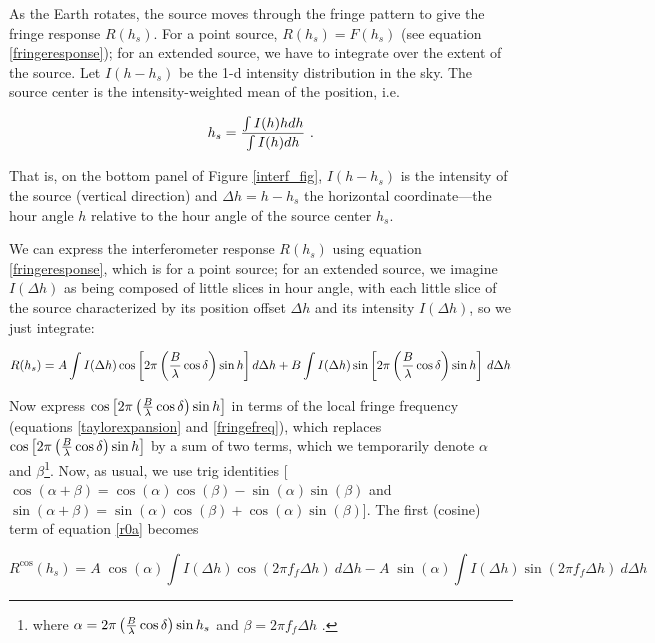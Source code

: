 \documentclass[11pt,preprint]{aastex}
\begin{document}
As the Earth rotates, the source moves through the fringe pattern to
give the fringe response $R(h_s)$. For a point source, $R(h_s)= F(h_s)$
(see equation \ref{fringeresponse}); for an extended source, we have to
integrate over the extent of the source.  Let $I(h - h_s)$ be the 1-d
intensity distribution in the sky. 
The source center is the intensity-weighted mean of the
position, i.e.

\begin{equation}
h_s = { \int I(h)h dh \over \int I(h) dh} \ .
\end{equation}

\noindent That is, on the bottom panel of
Figure \ref{interf_fig}, $I(h - h_s)$ is the intensity of the source (vertical
direction) and $\Delta h= h -h_s$ the horizontal coordinate---the hour
angle $h$ relative to the hour angle of the source center $h_s$. 


We can express the interferometer response $R(h_s)$ using equation
\ref{fringeresponse}, which is for a point source; for an extended source, we
imagine $I(\Delta h)$ as being composed of little slices in hour angle,
with each little slice of the source characterized by its position
offset $\Delta h$ and its intensity $I(\Delta h)$, so we just integrate:

\begin{equation} \label{r0a}
R(h_s) = A \int I(\Delta h) \cos \left[ 2\pi \left( {B \over \lambda}
	\cos\delta \right) \sin h\right] d \Delta h +  
	B \int I(\Delta h) \sin\left[ 2\pi \left( {B \over \lambda}
	\cos\delta \right) \sin h \right] \, d \Delta h
\end{equation} 

Now express $\cos \left[ 2\pi \left( {B \over \lambda} \cos\delta
\right) \sin h\right]$ in terms of the local fringe frequency (equations
\ref{taylorexpansion} and \ref{fringefreq}), which replaces $\cos \left[
2\pi \left( {B \over \lambda} \cos\delta \right) \sin h\right]$ by a sum
of two terms, which we temporarily denote $\alpha$ and
$\beta$\footnote{where $\alpha = 2 \pi \left( {B \over \lambda}
\cos\delta \right) \sin{h_s}$ and $\beta = 2 \pi f_f
\Delta h$ .}.  Now, as usual, we use trig identities [$\cos(\alpha +
\beta) = \cos(\alpha) \cos(\beta) - \sin(\alpha) \sin(\beta)$ and
$\sin(\alpha + \beta) = \sin(\alpha) \cos(\beta) + \cos(\alpha)
\sin(\beta)$]. The first (cosine) term of equation \ref{r0a} becomes

\begin{equation}
R^{\cos}(h_s) = A \; \cos(\alpha) \int I(\Delta h) \cos(2\pi f_f \Delta
h) \ d \Delta h 
-A \; \sin(\alpha) \int I(\Delta h) \sin(2\pi f_f \Delta
h) \ d \Delta h 
\end{equation}
\end{document}
